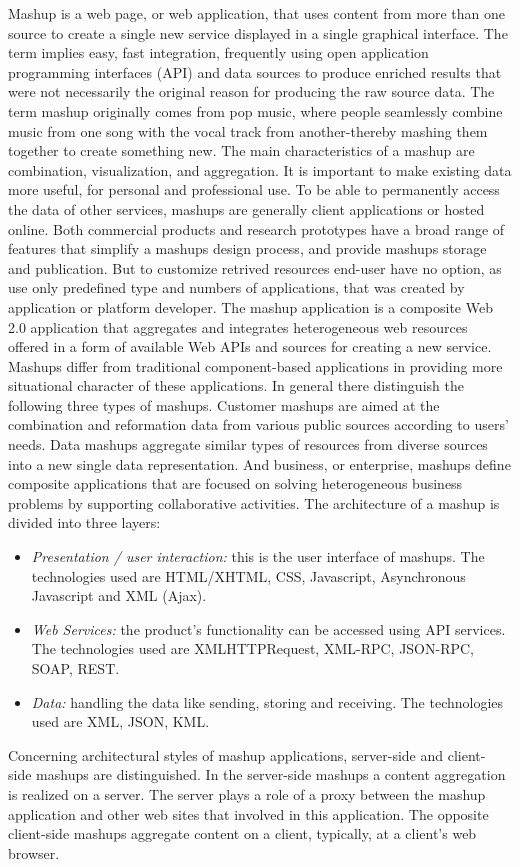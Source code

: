 		Mashup is a web page, or web application, that uses content from more than one source to create a single new service displayed in a single graphical interface. The term implies easy, fast integration, frequently using open application programming interfaces (API) and data sources to produce enriched results that were not necessarily the original reason for producing the raw source data. The term mashup originally comes from pop music, where people seamlessly combine music from one song with the vocal track from another-thereby mashing them together to create something new. The main characteristics of a mashup are combination, visualization, and aggregation. It is important to make existing data more useful, for personal and professional use. To be able to permanently access the data of other services, mashups are generally client applications or hosted online. Both commercial products and research prototypes have a broad range of features that simplify a mashups design process, and provide mashups storage and publication. But to customize retrived resources end-user have no option, as use only predefined type and numbers of applications, that was created by application or platform developer. 
		The mashup application is a composite Web 2.0 application that aggregates and integrates heterogeneous web resources offered in a form of available Web APIs and sources for creating a new service. Mashups differ from traditional component-based applications in providing more situational character of these applications\cite{yu2008understanding}. In general there distinguish the following three types of mashups\cite{ibrahim2012framework}. Customer mashups are aimed at the combination and reformation data from various public sources according to users’ needs. Data mashups aggregate similar types of resources from diverse sources into a new single data representation. And business, or enterprise, mashups define composite applications that are focused on solving heterogeneous business problems by supporting collaborative activities\cite{hoyer2008enterprise}. The architecture of a mashup is divided into three layers:
		 \newline
		 \begin{itemize}
		\item \emph{Presentation / user interaction:} this is the user interface of mashups. The technologies used are HTML/XHTML, CSS, Javascript, Asynchronous Javascript and XML (Ajax).
		\item \emph{Web Services:} the product's functionality can be accessed using API services. The technologies used are XMLHTTPRequest, XML-RPC, JSON-RPC, SOAP, REST.
		\item \emph{Data:} handling the data like sending, storing and receiving. The technologies used are XML, JSON, KML.
		\end{itemize}
		Concerning architectural styles of mashup applications, server-side and client- side mashups are distinguished. In the server-side mashups a content aggregation is realized on a server\cite{mashA}. The server plays a role of a proxy between the mashup application and other web sites that involved in this application. The opposite client-side mashups aggregate content on a client, typically, at a client’s web browser\cite{mashB}.


